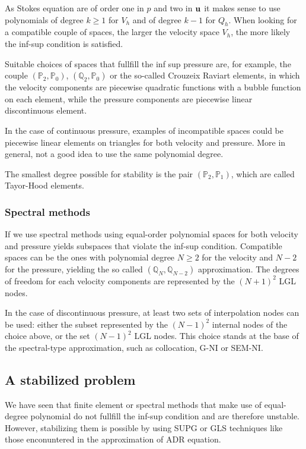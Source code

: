 As Stokes equation are of order one in \(p\) and two in \(\textbf{u}\) it makes sense to use polynomials of degree \(k \geq 1\) for \(V_h\) and of degree \(k-1\) for \(Q_h\).  When looking for a compatible couple of spaces, the larger the velocity space \(V_h\), the more likely the inf-sup condition is satisfied. 

Suitable choices of spaces that fullfill the inf sup pressure are, for example, the couple \((\mathbb{P}_2, \mathbb{P}_0)\), \((\mathbb{Q}_2, \mathbb{P}_0)\) or the so-called Crouzeix Raviart elements, in which the velocity components are piecewise quadratic functions with a bubble function on each element, while the pressure components are piecewise linear discontinuous element.

In the case of continuous pressure, examples of incompatible spaces could be piecewise linear elements on triangles for both velocity and pressure. More in general, not a good idea to use the same polynomial degree.

The smallest degree possible for stability is the pair \((\mathbb{P}_2, \mathbb{P}_1)\), which are called Tayor-Hood elements.
\subsubsection*{Spectral methods}
If we use spectral methods using equal-order polynomial spaces for both velocity and pressure yields subspaces that violate the inf-sup condition. Compatible spaces can be the ones with polynomial degree \(N \geq 2\) for the velocity and \(N-2\) for the pressure, yielding the so called \((\mathbb{Q}_N, \mathbb{Q}_{N-2})\) approximation. The degrees of freedom for each velocity components are represented by the \((N+1)^2\) LGL nodes.

In the case of discontinuous pressure, at least two sets of interpolation nodes can be used: either the subset represented by the \((N-1)^2\) internal nodes of the choice above, or the set \((N-1)^2\) LGL nodes. This choice stands at the base of the spectral-type approximation, such as collocation, G-NI or SEM-NI.
\subsection{A stabilized problem}
We have seen that finite element or spectral methods that make use of equal-degree polynomial do not fullfill the inf-sup condition and are therefore unstable. However, stabilizing them is possible by using SUPG or GLS techniques like those enconuntered in the approximation of ADR equation.

